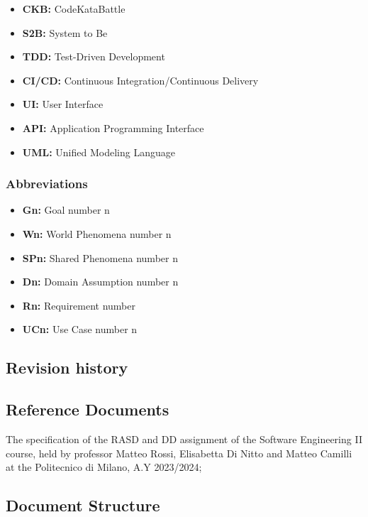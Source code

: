 \documentclass{article}
\begin{document}
\begin{itemize}
    \item \textbf{CKB:} CodeKataBattle
    \item \textbf{S2B:} System to Be
    \item \textbf{TDD:} Test-Driven Development
    \item \textbf{CI/CD:} Continuous Integration/Continuous Delivery
    \item \textbf{UI:} User Interface
    \item \textbf{API:} Application Programming Interface
    \item \textbf{UML:} Unified Modeling Language
\end{itemize}

\subsubsection{Abbreviations}

\begin{itemize}
    \item \textbf{Gn:} Goal number n
    \item \textbf{Wn:} World Phenomena number n
    \item \textbf{SPn:} Shared Phenomena number n
    \item \textbf{Dn:} Domain Assumption number n
    \item \textbf{Rn:} Requirement number 
    \item \textbf{UCn:} Use Case number n
\end{itemize}


\subsection{Revision history}
\subsection{Reference Documents}

The specification of the RASD and DD assignment of the Software
Engineering II course, held by professor Matteo Rossi, Elisabetta Di Nitto and
Matteo Camilli at the Politecnico di Milano, A.Y 2023/2024;

\subsection{Document Structure}
\end{document}
